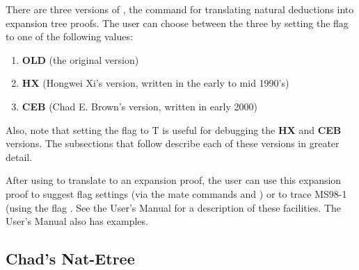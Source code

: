 There are three versions of ,
the command for translating natural deductions into
expansion tree proofs.  The user can choose between
the three by setting the flag 
to one of the following values:
\begin{enumerate}
\item {\bf OLD}  (the original version)
\item {\bf HX} (Hongwei Xi's version, written in the early
to mid 1990's)
\item {\bf CEB} (Chad E. Brown's version, written in early 2000)
\end{enumerate}
Also, note that setting the flag 
to T is useful for debugging the {\bf HX} and {\bf CEB}
versions.  The subsections that follow describe each of these
versions in greater detail.

After using  to translate to an
expansion proof, the user can use this expansion proof
to suggest flag settings (via the mate commands
 and )
or to trace MS98-1 (using the flag .  
See the User's Manual for a description
of these facilities.  The User's Manual also has examples.

\subsection{Chad's Nat-Etree}\label{ceb-nat-etr}

